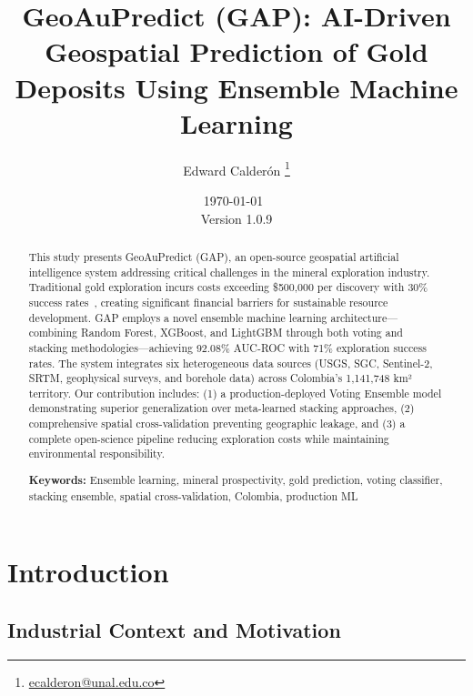 \documentclass[12pt,a4paper]{article}
\title{\textbf{GeoAuPredict (GAP): AI-Driven Geospatial Prediction of Gold Deposits Using Ensemble Machine Learning}}
\author{Edward Calderón \thanks{\href{mailto:ecalderon@unal.edu.co}{ecalderon@unal.edu.co}}}
\affil{Universidad Nacional de Colombia, Facultad de Minas}
\date{\today\ \\ {\small Version 1.0.9}}
\begin{document}
\maketitle

\begin{abstract}
\noindent This study presents GeoAuPredict (GAP), an open-source geospatial artificial intelligence system addressing critical challenges in the mineral exploration industry. Traditional gold exploration incurs costs exceeding \$500,000 per discovery with 30\% success rates~\citep{colombian_gold}, creating significant financial barriers for sustainable resource development. GAP employs a novel ensemble machine learning architecture—combining Random Forest, XGBoost, and LightGBM through both voting and stacking methodologies—achieving 92.08\% AUC-ROC with 71\% exploration success rates. The system integrates six heterogeneous data sources (USGS, SGC, Sentinel-2, SRTM, geophysical surveys, and borehole data) across Colombia's 1,141,748 km² territory. Our contribution includes: (1) a production-deployed Voting Ensemble model demonstrating superior generalization over meta-learned stacking approaches, (2) comprehensive spatial cross-validation preventing geographic leakage, and (3) a complete open-science pipeline reducing exploration costs while maintaining environmental responsibility.

\vspace{0.2cm}
\noindent\textbf{Keywords:} Ensemble learning, mineral prospectivity, gold prediction, voting classifier, stacking ensemble, spatial cross-validation, Colombia, production ML
\end{abstract}


\vspace{0.3cm}
\noindent{}
\vspace{0.3cm}

\newpage

\section{Introduction}

\subsection{Industrial Context and Motivation}
\end{document}
